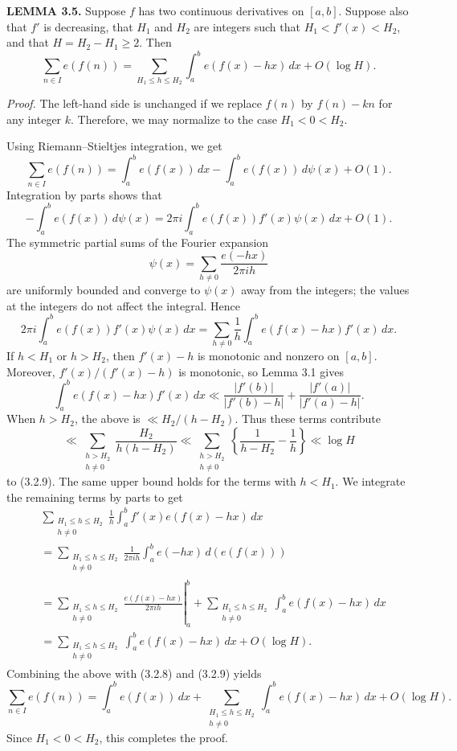 \documentclass[10pt]{article}
\begin{document}
\medskip
\noindent\textbf{LEMMA 3.5.}
Suppose $f$ has two continuous derivatives on $[a,b]$. Suppose also that $f'$
is decreasing, that $H_1$ and $H_2$ are integers such that
$H_1<f'(x)<H_2$, and that $H=H_2-H_1\geq2$. Then
\[
 \sum_{n\in I}e(f(n))
 =\sum_{H_1\leq h\leq H_2}\int_a^b e(f(x)-hx)\,dx+O(\log H).
\]

\noindent\textit{Proof.}
The left-hand side is unchanged if we replace $f(n)$ by $f(n)-kn$ for any
integer $k$. Therefore, we may normalize to the case $H_1<0<H_2$.

Using Riemann--Stieltjes integration, we get
\begin{equation*}
 \sum_{n\in I}e(f(n))
 =\int_a^b e(f(x))\,dx-\int_a^b e(f(x))\,d\psi(x)+O(1). \tag{3.2.8}
\end{equation*}
Integration by parts shows that
\[
 -\int_a^b e(f(x))\,d\psi(x)
 =2\pi i\int_a^b e(f(x))f'(x)\psi(x)\,dx+O(1).
\]
The symmetric partial sums of the Fourier expansion
\[
 \psi(x)=\sum_{h\neq0}\frac{e(-hx)}{2\pi i h}
\]
are uniformly bounded and converge to $\psi(x)$ away from the integers; the
values at the integers do not affect the integral. Hence
\begin{equation*}
 2\pi i\int_a^b e(f(x))f'(x)\psi(x)\,dx
 =\sum_{h\neq0}\frac1h\int_a^b e(f(x)-hx)f'(x)\,dx. \tag{3.2.9}
\end{equation*}
If $h<H_1$ or $h>H_2$, then $f'(x)-h$ is monotonic and nonzero on $[a,b]$.
Moreover, $f'(x)/(f'(x)-h)$ is monotonic, so Lemma 3.1 gives
\[
 \int_a^b e(f(x)-hx)f'(x)\,dx
 \ll\frac{|f'(b)|}{|f'(b)-h|}+\frac{|f'(a)|}{|f'(a)-h|}.
\]
When $h>H_2$, the above is $\ll H_2/(h-H_2)$. Thus these terms contribute
\[
 \ll\sum_{\substack{h>H_2\\h\neq0}}\frac{H_2}{h(h-H_2)}
 \ll\sum_{\substack{h>H_2\\h\neq0}}
 \left\{\frac1{h-H_2}-\frac1h\right\}
 \ll\log H
\]
to (3.2.9). The same upper bound holds for the terms with $h<H_1$. We
integrate the remaining terms by parts to get
\[
\begin{aligned}
 &\sum_{\substack{H_1\leq h\leq H_2\\h\neq0}}
   \frac1h\int_a^b f'(x)e(f(x)-hx)\,dx \\
 &=\sum_{\substack{H_1\leq h\leq H_2\\h\neq0}}
   \frac1{2\pi i h}\int_a^b e(-hx)\,d(e(f(x))) \\
 &=\left.\sum_{\substack{H_1\leq h\leq H_2\\h\neq0}}
   \frac{e(f(x)-hx)}{2\pi i h}\right|_a^b
   +\sum_{\substack{H_1\leq h\leq H_2\\h\neq0}}
   \int_a^b e(f(x)-hx)\,dx \\
 &=\sum_{\substack{H_1\leq h\leq H_2\\h\neq0}}
   \int_a^b e(f(x)-hx)\,dx+O(\log H).
\end{aligned}
\]
Combining the above with (3.2.8) and (3.2.9) yields
\[
 \sum_{n\in I}e(f(n))
 =\int_a^b e(f(x))\,dx
 +\sum_{\substack{H_1\leq h\leq H_2\\h\neq0}}
  \int_a^b e(f(x)-hx)\,dx+O(\log H).
\]
Since $H_1<0<H_2$, this completes the proof.
\end{document}
